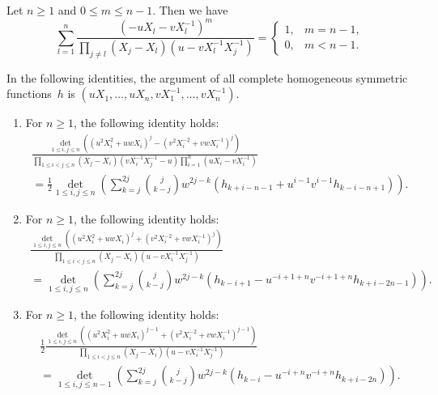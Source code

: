 \documentclass[10pt,a4paper]{amsart}
\begin{document}
	\begin{lemma} 
		\label{prefactor} 
		Let $n \ge 1$ and $0 \le m \le n-1$. Then we have 
		\begin{equation*}
		\sum_{l=1}^n  \frac{(-u X_l - v X_l^{-1})^{m}}{\prod_{j \not= l} (X_j-X_l)(u-v X_l^{-1} X_j^{-1})} =  
		\begin{cases}1, & m=n-1,\\0, & m<n-1. \end{cases}
		\end{equation*} 
	\end{lemma} 

	\begin{cor} 
		\label{jacobitrudi3cor}
		In the following identities, the argument of all complete homogeneous symmetric functions~$h$ is $(u X_1,\ldots,u X_n,v X_1^{-1},\ldots,v X_n^{-1}).$
		\begin{enumerate}
			\item\label{cor:jacobitrudi3cor1} For $n \ge 1$, the following identity holds: 
			\begin{multline*}
				\frac{
					\det_{1 \le i,j \le n} \left( \left(u^2 X_i^2 + u w X_i\right)^j - \left(v^2 X_i^{-2} + v w X_i^{-1}\right)^j \right)}
				{\prod_{1 \le i < j \le n} (X_j-X_i)(v X_i^{-1} X_j^{-1}-u) \prod_{i=1}^{n} (u X_i -v X_i^{-1})} \\
				=
				\frac{1}{2} \det_{1 \le i,j \le n} \left(  \sum_{k=j}^{2j} \binom{j}{k-j} w^{2j-k} 
				(h_{k+i-n-1} + u^{i-1} v^{i-1} h_{k-i-n+1} )  \right). 
			\end{multline*} 
			\item\label{cor:jacobitrudi3cor2}For $n \ge 1$, the following identity holds:
			\begin{multline*}
				\frac{
					\det_{1 \le i,j \le n} \left( \left(u^2 X_i^2 + u w X_i\right)^j + \left(v^2 X_i^{-2} + v w X_i^{-1}\right)^j \right)}
				{\prod_{1 \le i < j \le n} (X_j-X_i)(u- v X_i^{-1} X_j^{-1})} \\ 
				=
				\det_{1 \le i, j \le n } \left( \sum_{k=j}^{2j} \binom{j}{k-j} w^{2j-k}  \left(  h_{k-i+1} - u^{-i+1+n} v^{-i+1+n} h_{k+i-2n-1} \right) \right).
			\end{multline*} 
			\item\label{cor:jacobitrudi3cor3} For $n \ge 1$, the following identity holds:
			\begin{multline*}
				\frac{1}{2}  \frac{\det_{1 \le i,j \le n} \left( \left(u^2 X_i^2 + u w X_i\right)^{j-1} + \left(v^2 X_i^{-2} + v w X_i^{-1}\right)^{j-1} \right)}
				{\prod_{1 \le i < j \le n} (X_j-X_i)(u - v X_i^{-1} X_j^{-1})} \\
				=
				\det_{1 \le i, j \le n-1} \left( \sum_{k=j}^{2j} \binom{j}{k-j} w^{2j-k}  \left( h_{k-i} - u^{-i+n} v^{-i+n} h_{k+i-2n} \right) \right).
			\end{multline*} 
		\end{enumerate} 
	\end{cor} 
\end{document}
